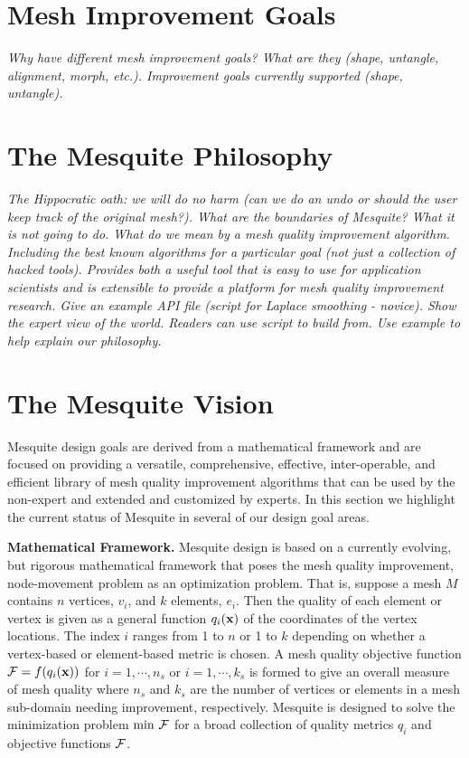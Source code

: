 \documentclass[letter]{report}
\begin{document}
\section{Mesh Improvement Goals}

{\it Why have different mesh improvement goals? What are they (shape,
untangle, alignment, morph, etc.). Improvement goals currently
supported (shape, untangle).  }

\section{The Mesquite Philosophy}

{\it 
The Hippocratic oath: we will do no harm (can we do an undo or
should the user keep track of the original mesh?).  What are the
boundaries of Mesquite?  What it is not going to do. What do we mean
by a mesh quality improvement algorithm. Including the best known
algorithms for a particular goal (not just a collection of hacked
tools). Provides both a useful tool that is easy to use for
application scientists and is extensible to provide a platform for
mesh quality improvement research. Give an example API file (script for
Laplace smoothing - novice). Show the expert view of the
world. Readers can use script to build from. Use example to help
explain our philosophy. 
}

\section{The Mesquite Vision}

Mesquite design goals are derived from a mathematical framework and
are focused on providing a versatile, comprehensive, effective,
inter-operable, and efficient library of mesh quality improvement
algorithms that can be used by the non-expert and extended and
customized by experts.  In this section we highlight the current
status of Mesquite in several of our design goal areas.

{\bf Mathematical Framework.}  Mesquite design is based on a currently
evolving, but rigorous mathematical framework that poses the mesh
quality improvement, node-movement problem as an optimization problem.
That is, suppose a mesh $M$ contains $n$ vertices, $v_i$, and $k$
elements, $e_i$.  Then the quality of each element or vertex is given
as a general function $q_i ( {\bf x} )$ of the coordinates of the
vertex locations.  The index $i$ ranges from 1 to $n$ or 1 to $k$
depending on whether a vertex-based or element-based metric is chosen.
A mesh quality objective function ${\cal F} = f(q_i({\bf x} ))$ for
$i=1,\cdots,n_s$ or $i=1,\cdots,k_s$ is formed to give an overall
measure of mesh quality where $n_s$ and $k_s$ are the number of
vertices or elements in a mesh sub-domain needing improvement,
respectively.  Mesquite is designed to solve the minimization problem
${\rm min}~{\cal F}$ for a broad collection of quality metrics $q_i$
and objective functions ${\cal F}$.
\end{document}
